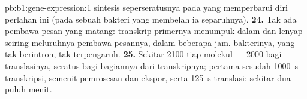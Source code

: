 \begin{solution}{pb:b1:gene-expression:1}
sintesis  seperseratusnya pada  yang memperbarui diri
perlahan ini (pada sebuah bakteri yang membelah ia separuhnya).
\textbf{24.} Tak ada pembawa pesan yang matang: transkrip primernya
menumpuk dalam  dan  lenyap seiring meluruhnya
pembawa pesannya, dalam beberapa jam.  bakterinya, yang 
tak berintron, tak terpengaruh.
\textbf{25.} Sekitar 2100  tiap molekul --- 2000 bagi translasinya,
seratus bagi bagiannya dari transkripnya;  pertama sesudah
\qty{1000}{s} transkripsi, semenit pemrosesan dan ekspor, serta
\qty{125}{s} translasi: sekitar dua puluh menit.
\end{solution}

